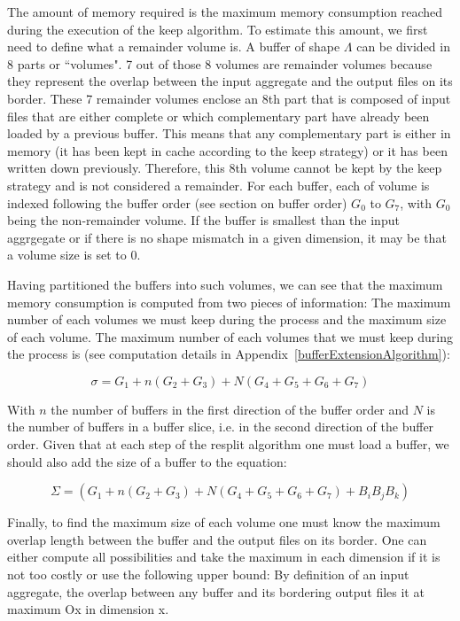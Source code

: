 \documentclass[conference]{IEEEtran}
\begin{document}
The amount of memory required is the maximum memory consumption reached during
the execution of the keep algorithm. To estimate this amount, we first need to
define what a remainder volume is. A buffer of shape $\Lambda$ can be divided in
8 parts or ``volumes". 7 out of those 8 volumes are remainder volumes because
they represent the overlap between the input aggregate and the output files on
its border. These 7 remainder volumes enclose an 8th part that is composed of
input files that are either complete or which complementary part have already
been loaded by a previous buffer. This means that any complementary part is either
in memory (it has been kept in cache according to the keep strategy) or it has
been written down previously. Therefore, this 8th volume cannot be kept by the
keep strategy and is not considered a remainder. For each buffer, each of volume
is indexed following the buffer order (see section on buffer order) $G_0$ to $G_7$, with
$G_0$ being the non-remainder volume. If the buffer is smallest than the input
aggrgegate or if there is no shape mismatch in a given dimension, it may be that
a volume size is set to 0.

Having partitioned the buffers into such volumes, we can see that the maximum
memory consumption is computed from two pieces of information: The maximum number
of each volumes we must keep during the process and the maximum size of each
volume. The maximum number of each volumes that we must keep during the process
is (see computation details in Appendix~\ref{bufferExtensionAlgorithm}):

\begin{equation} \label{eq:1}
\sigma = G_1 + n(G_2 + G_3) + N(G_4 + G_5 + G_6 + G_7)
\end{equation}

With $n$ the number of buffers in the first direction of the buffer order and
$N$ is the number of buffers in a buffer slice, i.e. in the second direction of
the buffer order. Given that at each step of the resplit algorithm one must
load a buffer, we should also add the size of a buffer to the equation:

\begin{equation} \label{eq:2}
\Sigma = (G_1 + n(G_2 + G_3) + N(G_4 + G_5 + G_6 + G_7) + B_iB_jB_k)
\end{equation}

Finally, to find the maximum size of each volume one must know the maximum
overlap length between the buffer and the output files on its border. One can
either compute all possibilities and take the maximum in each dimension if it is
not too costly or use the following upper bound: By definition of an input
aggregate, the overlap between any buffer and its bordering output files it at
maximum Ox in dimension x.
\end{document}
